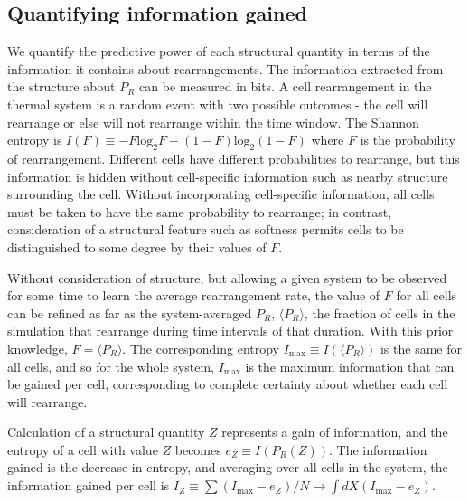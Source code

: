 \documentclass[twoside,twocolumn,9pt]{article}
\begin{document}
\subsection{Quantifying information gained}

We quantify the predictive power of each structural quantity in terms of the information it contains about rearrangements. The information extracted from the structure about $P_R$ can be measured in bits.
A cell rearrangement in the thermal system is a random event with two possible outcomes - the cell will rearrange or else will not rearrange within the time window.
The Shannon entropy is $I(F) \equiv - F \text{log}_2 F - (1-F) \text{log}_2 (1-F)$ where $F$ is the probability of rearrangement.
Different cells have different probabilities to rearrange, but this information is hidden without cell-specific information such as nearby structure surrounding the cell.
Without incorporating cell-specific information, all cells must be taken to have the same probability to rearrange; in contrast, consideration of a structural feature such as softness permits cells to be distinguished to some degree by their values of $F$.

Without consideration of structure, but allowing a given system to be observed for some time to learn the average rearrangement rate, the value of $F$ for all cells can be refined as far as the system-averaged $P_R$, $\langle P_R \rangle$, the fraction of cells in the simulation that rearrange during time intervals of that duration.
With this prior knowledge, $F=\langle P_R \rangle$.
The corresponding entropy $I_\text{max} \equiv I(\langle P_R \rangle)$ is the same for all cells, and so for the whole system, $I_\text{max}$ is the maximum information that can be gained per cell, corresponding to complete certainty about whether each cell will rearrange.

Calculation of a structural quantity $Z$ represents a gain of information, and the entropy of a cell with value $Z$ becomes $e_Z \equiv I(P_R(Z))$.
The information gained is the decrease in entropy, and averaging over all cells in the system, the information gained per cell is $I_Z \equiv \sum (I_\text{max} - e_Z) /N \to \int dX (I_\text{max} - e_Z)$.
\end{document}
